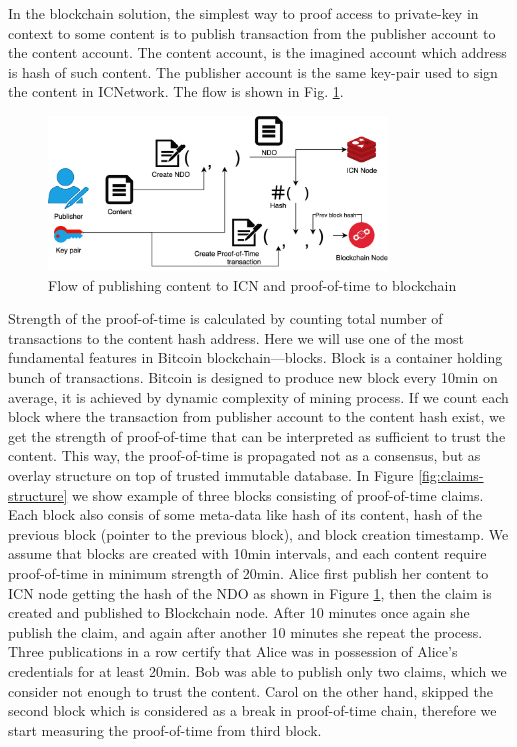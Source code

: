\documentclass[nostrict]{szablonPG}
\begin{document}
In the blockchain solution, the simplest way to proof access to private-key in context to some content is to publish transaction from the publisher account to the content account. The content account, is the imagined account which address is hash of such content. The publisher account is the same key-pair used to sign the content in ICNetwork. The flow is shown in Fig. \ref{fig:distribution-flow}.
\begin{figure}[h!]
\includegraphics[width=9cm]{img/distribution-flow.png}
\centering
\caption{Flow of publishing content to ICN and proof-of-time to blockchain}
\label{fig:distribution-flow}
\end{figure} 
Strength of the proof-of-time is calculated by counting total number of transactions to the content hash address. Here we will use one of the most fundamental features in Bitcoin blockchain––blocks. Block is a container holding bunch of transactions. Bitcoin is designed to produce new block every 10min on average, it is achieved by dynamic complexity of mining process. If we count each block where the transaction from publisher account to the content hash exist, we get the strength of proof-of-time that can be interpreted as sufficient to trust the content. This way, the proof-of-time is propagated not as a consensus, but as overlay structure on top of trusted immutable database. In Figure \ref{fig:claims-structure} we show example of three blocks consisting of proof-of-time claims. Each block also consis of some meta-data like hash of its content, hash of the previous block (pointer to the previous block), and block creation timestamp. We assume that blocks are created with 10min intervals, and each content require proof-of-time in minimum strength of 20min. Alice first publish her content to ICN node getting the hash of the NDO as shown in Figure \ref{fig:distribution-flow}, then the claim is created and published to Blockchain node. After 10 minutes once again she publish the claim, and again after another 10 minutes she repeat the process. Three publications in a row certify that Alice was in possession of Alice's credentials for at least 20min. Bob was able to publish only two claims, which we consider not enough to trust the content. Carol on the other hand, skipped the second block which is considered as a break in proof-of-time chain, therefore we start measuring the proof-of-time from third block.
\end{document}
